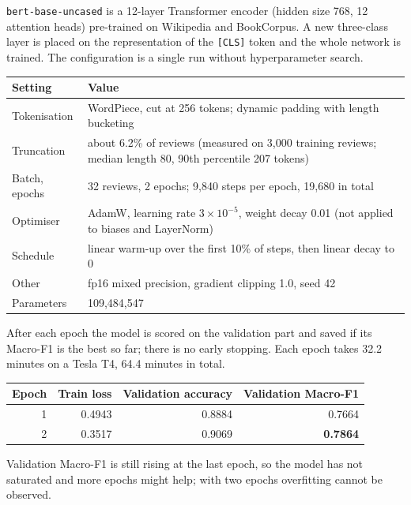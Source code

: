 \texttt{bert-base-uncased} is a 12-layer Transformer encoder (hidden size 768, 12 attention heads) pre-trained on Wikipedia and BookCorpus. A new three-class layer is placed on the representation of the \texttt{[CLS]} token and the whole network is trained. The configuration is a single run without hyperparameter search.

\begin{center}
\begin{tabular}{@{}p{5cm}p{9cm}@{}}
    \toprule
    Setting & Value \\
    \midrule
    Tokenisation & WordPiece, cut at 256 tokens; dynamic padding with length bucketing \\
    Truncation & about 6.2\% of reviews (measured on 3{,}000 training reviews; median length 80, 90th percentile 207 tokens) \\
    Batch, epochs & 32 reviews, 2 epochs; 9{,}840 steps per epoch, 19{,}680 in total \\
    Optimiser & AdamW, learning rate $3\times10^{-5}$, weight decay 0.01 (not applied to biases and LayerNorm) \\
    Schedule & linear warm-up over the first 10\% of steps, then linear decay to 0 \\
    Other & fp16 mixed precision, gradient clipping 1.0, seed 42 \\
    Parameters & 109{,}484{,}547 \\
    \bottomrule
\end{tabular}
\end{center}

After each epoch the model is scored on the validation part and saved if its Macro-F1 is the best so far; there is no early stopping. Each epoch takes 32.2 minutes on a Tesla T4, 64.4 minutes in total.

\begin{center}
\begin{tabular}{@{}rrrr@{}}
    \toprule
    Epoch & Train loss & Validation accuracy & Validation Macro-F1 \\
    \midrule
    1 & 0.4943 & 0.8884 & 0.7664 \\
    2 & 0.3517 & 0.9069 & \textbf{0.7864} \\
    \bottomrule
\end{tabular}
\end{center}

Validation Macro-F1 is still rising at the last epoch, so the model has not saturated and more epochs might help; with two epochs overfitting cannot be observed.

